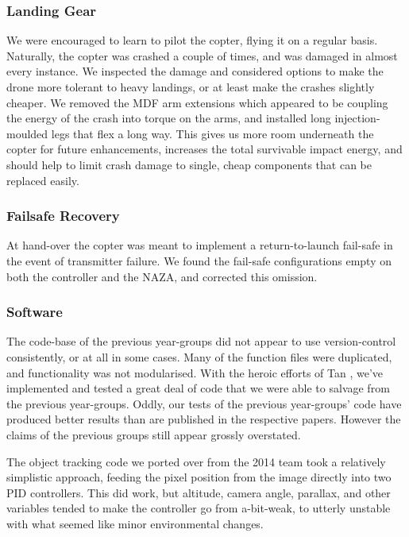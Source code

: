 \documentclass[a4paper, 11pt, titlepage]{article}
\begin{document}
    \subsubsection{Landing Gear}
      We were encouraged to learn to pilot the copter, flying it on a regular basis.  Naturally, the copter was crashed a couple of times, and was damaged in almost every instance.  We inspected the damage and considered options to make the drone more tolerant to heavy landings, or at least make the crashes slightly cheaper.
      We removed the MDF arm extensions which appeared to be coupling the energy of the crash into torque on the arms, and installed long injection-moulded legs that flex a long way. This gives us more room underneath the copter for future enhancements, increases the total survivable impact energy, and should help to limit crash damage to single, cheap components that can be replaced easily.

    \subsubsection{Failsafe Recovery}
      At hand-over the copter was meant to implement a return-to-launch fail-safe in the event of transmitter failure.  We found the fail-safe configurations empty on both the controller and the NAZA, and corrected this omission.

    \subsubsection{Software}
      The code-base of the previous year-groups did not appear to use version-control consistently, or at all in some cases.  Many of the function files were duplicated, and functionality was not modularised.
      With the heroic efforts of Tan \cite{Tan}, we've implemented and tested a great deal of code that we were able to salvage from the previous year-groups.  
      Oddly, our tests of the previous year-groups' code have produced better results than are published in the respective papers.  However the claims of the previous groups still appear grossly overstated.

      The object tracking code we ported over from the 2014 team took a relatively simplistic approach, feeding the pixel position from the image directly into two PID controllers.  This did work, but altitude, camera angle, parallax, and other variables tended to make the controller go from a-bit-weak, to utterly unstable with what seemed like minor environmental changes.
\end{document}
